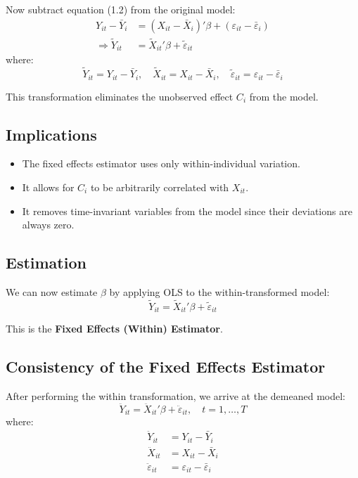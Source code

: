 \documentclass[12pt, oneside]{article}
\begin{document}
Now subtract equation (1.2) from the original model:
\begin{align*}
Y_{it} - \bar{Y}_i &= (X_{it} - \bar{X}_i)' \beta + (\varepsilon_{it} - \bar{\varepsilon}_i) \\
\Rightarrow \tilde{Y}_{it} &= \tilde{X}_{it}' \beta + \tilde{\varepsilon}_{it} \tag{1.3}
\end{align*}
where:
\[
\tilde{Y}_{it} = Y_{it} - \bar{Y}_i, \quad
\tilde{X}_{it} = X_{it} - \bar{X}_i, \quad
\tilde{\varepsilon}_{it} = \varepsilon_{it} - \bar{\varepsilon}_i
\]

This transformation eliminates the unobserved effect \( C_i \) from the model.

\subsection*{Implications}

\begin{itemize}
  \item The fixed effects estimator uses only within-individual variation.
  \item It allows for \( C_i \) to be arbitrarily correlated with \( X_{it} \).
  \item It removes time-invariant variables from the model since their deviations are always zero.
\end{itemize}

\subsection*{Estimation}

We can now estimate \( \beta \) by applying OLS to the within-transformed model:
\[
\tilde{Y}_{it} = \tilde{X}_{it}' \beta + \tilde{\varepsilon}_{it}
\]

This is the \textbf{Fixed Effects (Within) Estimator}.

\subsection*{Consistency of the Fixed Effects Estimator}

After performing the within transformation, we arrive at the demeaned model:
\[
\ddot{Y}_{it} = \ddot{X}_{it}' \beta + \ddot{\varepsilon}_{it}, \quad t = 1, \dots, T
\]
where:
\begin{align*}
\ddot{Y}_{it} &= Y_{it} - \bar{Y}_i \\
\ddot{X}_{it} &= X_{it} - \bar{X}_i \\
\ddot{\varepsilon}_{it} &= \varepsilon_{it} - \bar{\varepsilon}_i
\end{align*}
\end{document}
